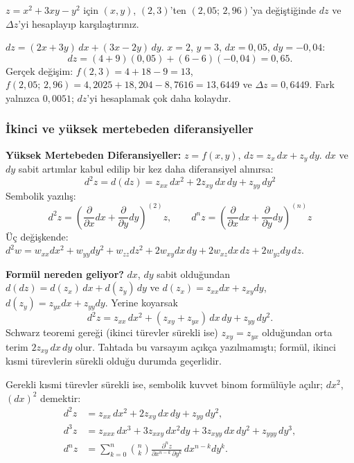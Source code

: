 \begin{soru}
$z=x^2+3xy-y^2$ için $(x,y)$, $(2,3)$'ten $(2{,}05;\,2{,}96)$'ya değiştiğinde $dz$ ve $\Delta z$'yi hesaplayıp
karşılaştırınız.
\end{soru}
\begin{cevap}
$dz=(2x+3y)\,dx+(3x-2y)\,dy$. $x=2$, $y=3$, $dx=0{,}05$, $dy=-0{,}04$:
\[ dz=(4+9)(0{,}05)+(6-6)(-0{,}04)=0{,}65 . \]
Gerçek değişim: $f(2,3)=4+18-9=13$, $f(2{,}05;\,2{,}96)=4{,}2025+18{,}204-8{,}7616=13{,}6449$ ve
$\Delta z=0{,}6449$. Fark yalnızca $0{,}0051$; $dz$'yi hesaplamak çok daha kolaydır.
\end{cevap}

\subsubsection{İkinci ve yüksek mertebeden diferansiyeller}

\begin{tahta}
\textbf{Yüksek Mertebeden Diferansiyeller:} $z=f(x,y)$, $dz=z_x\,dx+z_y\,dy$. $dx$ ve $dy$ sabit artımlar kabul edilip
bir kez daha diferansiyel alınırsa:
\[ d^2z=d(dz)=z_{xx}\,dx^2+2z_{xy}\,dx\,dy+z_{yy}\,dy^2 \]
Sembolik yazılış:
\[
d^2z=\left(\frac{\partial}{\partial x}dx+\frac{\partial}{\partial y}dy\right)^{(2)}z,\qquad
d^nz=\left(\frac{\partial}{\partial x}dx+\frac{\partial}{\partial y}dy\right)^{(n)}z
\]
Üç değişkende: $d^2w=w_{xx}dx^2+w_{yy}dy^2+w_{zz}dz^2+2w_{xy}dx\,dy+2w_{xz}dx\,dz+2w_{yz}dy\,dz$.
\end{tahta}

\textbf{Formül nereden geliyor?} $dx$, $dy$ sabit olduğundan $d(dz)=d(z_x)\,dx+d(z_y)\,dy$ ve
$d(z_x)=z_{xx}dx+z_{xy}dy$, $d(z_y)=z_{yx}dx+z_{yy}dy$. Yerine koyarsak
\[ d^2z=z_{xx}\,dx^2+(z_{xy}+z_{yx})\,dx\,dy+z_{yy}\,dy^2 . \]
Schwarz teoremi gereği (ikinci türevler sürekli ise) $z_{xy}=z_{yx}$ olduğundan orta terim $2z_{xy}\,dx\,dy$ olur. Tahtada
bu varsayım açıkça yazılmamıştı; formül, ikinci kısmi türevlerin sürekli olduğu durumda geçerlidir.

\begin{teorem}
Gerekli kısmi türevler sürekli ise, sembolik kuvvet binom formülüyle açılır; $dx^2$, $(dx)^2$ demektir:
\begin{align*}
d^2z&=z_{xx}\,dx^2+2z_{xy}\,dx\,dy+z_{yy}\,dy^2,\\
d^3z&=z_{xxx}\,dx^3+3z_{xxy}\,dx^2dy+3z_{xyy}\,dx\,dy^2+z_{yyy}\,dy^3,\\
d^nz&=\sum_{k=0}^{n}\binom nk\frac{\partial^nz}{\partial x^{n-k}\,\partial y^{k}}\,dx^{n-k}dy^{k}.
\end{align*}
\end{teorem}

